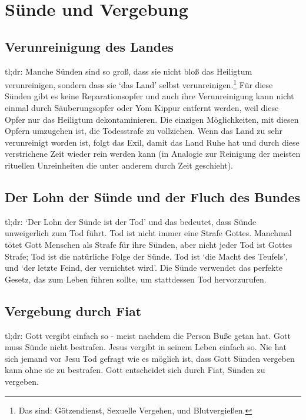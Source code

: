 \part{Sünde und Vergebung}
\chapter{Verunreinigung des Landes}
tl;dr:
Manche Sünden sind so groß, dass sie nicht bloß das Heiligtum verunreinigen, sondern dass sie `das Land' selbst verunreinigen.\footnote{
Das sind: Götzendienst, Sexuelle Vergehen, und Blutvergießen.}
Für diese Sünden gibt es keine Reparationsopfer und auch ihre Verunreinigung kann nicht einmal durch Säuberungsopfer oder Yom Kippur entfernt werden, weil
diese Opfer nur das Heiligtum dekontaminieren.
Die einzigen Möglichkeiten, mit diesen Opfern umzugehen ist, die Todesstrafe zu vollziehen.
Wenn das Land zu sehr verunreinigt worden ist, folgt das Exil, damit das Land Ruhe hat und durch diese verstrichene Zeit wieder rein werden kann (in Analogie zur Reinigung
der meisten rituellen Unreinheiten die unter anderem durch Zeit geschieht).

\chapter{\label{chap:bundesfluch}Der Lohn der Sünde und der Fluch des Bundes}
tl;dr:
`Der Lohn der Sünde ist der Tod' und das bedeutet, dass Sünde unweigerlich zum Tod führt.
Tod ist nicht immer eine Strafe Gottes.
Manchmal tötet Gott Menschen als Strafe für ihre Sünden, aber nicht jeder Tod ist Gottes Strafe; Tod ist die natürliche Folge der Sünde.
Tod ist `die Macht des Teufels', und `der letzte Feind, der vernichtet wird'.
Die Sünde verwendet das perfekte Gesetz, das zum Leben führen sollte, um stattdessen Tod hervorzurufen.


% 
\chapter{\label{chap-fiat}Vergebung durch Fiat}
tl;dr:
Gott vergibt einfach so - meist nachdem die Person Buße getan hat.
Gott muss Sünde nicht bestrafen.
Jesus vergibt in seinem Leben einfach so.
Nie hat sich jemand vor Jesu Tod gefragt wie es möglich ist, dass Gott Sünden vergeben kann ohne sie zu bestrafen.
Gott entscheidet sich durch Fiat, Sünden zu vergeben.


